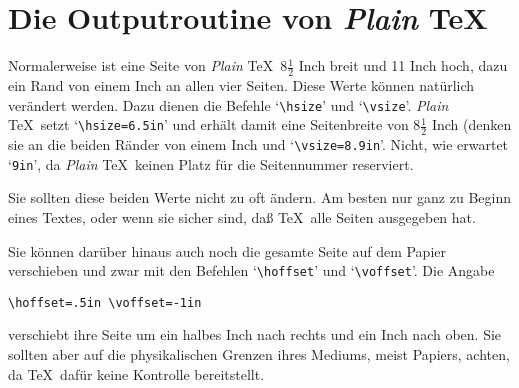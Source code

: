 \section{Die Outputroutine von {\em Plain} \TeX}
Normalerweise ist eine 
Seite von {\em Plain} \TeX\ $8\frac{1}{2}$ Inch breit und 11
Inch hoch, dazu ein 
Rand von einem Inch an allen vier Seiten. Diese
Werte k\"onnen nat\"urlich ver\"andert werden. Dazu dienen die Befehle
`\verb|\hsize|' und 
`\verb|\vsize|'. {\em Plain} \TeX\ setzt
`\verb|\hsize=6.5in|' und erh\"alt damit eine 
Seitenbreite von
$8\frac{1}{2}$ Inch (denken sie an die beiden R\"ander von einem Inch
und `\verb|\vsize=8.9in|'. Nicht, wie erwartet `\verb|9in|', da {\em Plain}
\TeX\ keinen Platz f\"ur die Seitennummer reserviert.

Sie sollten diese beiden Werte nicht zu oft \"andern. Am besten nur ganz
zu Beginn eines Textes, oder wenn sie sicher sind, da\ss{} \TeX\ alle
Seiten ausgegeben hat.

Sie k\"onnen dar\"uber hinaus auch noch die gesamte Seite auf dem Papier
verschieben und zwar mit den Befehlen 
`\verb|\hoffset|' und
`\verb|\voffset|'. Die Angabe
\begin{verbatim}
\hoffset=.5in \voffset=-1in
\end{verbatim}
verschiebt ihre Seite um ein halbes Inch nach rechts und ein Inch nach
oben. Sie sollten aber auf die physikalischen Grenzen ihres Mediums,
meist Papiers, achten, da \TeX\ daf\"ur keine Kontrolle bereitstellt.

